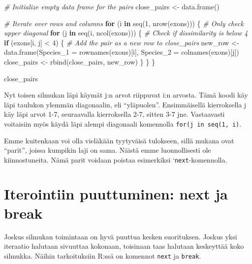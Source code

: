 \documentclass[
]{book}
\newenvironment{Shaded}{\begin{snugshade}}{\end{snugshade}}
\newcommand{\AttributeTok}[1]{\textcolor[rgb]{0.77,0.63,0.00}{#1}}
\newcommand{\CommentTok}[1]{\textcolor[rgb]{0.56,0.35,0.01}{\textit{#1}}}
\newcommand{\ControlFlowTok}[1]{\textcolor[rgb]{0.13,0.29,0.53}{\textbf{#1}}}
\newcommand{\DecValTok}[1]{\textcolor[rgb]{0.00,0.00,0.81}{#1}}
\newcommand{\FunctionTok}[1]{\textcolor[rgb]{0.00,0.00,0.00}{#1}}
\newcommand{\NormalTok}[1]{#1}
\newcommand{\OtherTok}[1]{\textcolor[rgb]{0.56,0.35,0.01}{#1}}
\newcommand{\SpecialCharTok}[1]{\textcolor[rgb]{0.00,0.00,0.00}{#1}}
\begin{document}
\begin{Shaded}
\begin{Highlighting}[]
\CommentTok{\# Initialize empty data frame for the pairs}
\NormalTok{close\_pairs }\OtherTok{\textless{}{-}} \FunctionTok{data.frame}\NormalTok{()}

\CommentTok{\# Iterate over rows and columns}
\ControlFlowTok{for}\NormalTok{ (i }\ControlFlowTok{in} \FunctionTok{seq}\NormalTok{(}\DecValTok{1}\NormalTok{, }\FunctionTok{nrow}\NormalTok{(exons))) \{}
  \CommentTok{\# Only check upper diagonal}
  \ControlFlowTok{for}\NormalTok{ (j }\ControlFlowTok{in} \FunctionTok{seq}\NormalTok{(i, }\FunctionTok{ncol}\NormalTok{(exons))) \{}
    \CommentTok{\# Check if dissimilarity is below 4}
    \ControlFlowTok{if}\NormalTok{ (exons[i, j] }\SpecialCharTok{\textless{}} \DecValTok{4}\NormalTok{) \{}
      \CommentTok{\# Add the pair as a new row to close\_pairs}
\NormalTok{      new\_row }\OtherTok{\textless{}{-}} \FunctionTok{data.frame}\NormalTok{(}\AttributeTok{Species\_1 =} \FunctionTok{rownames}\NormalTok{(exons)[i],}
                            \AttributeTok{Species\_2 =} \FunctionTok{colnames}\NormalTok{(exons)[j])}
\NormalTok{      close\_pairs }\OtherTok{\textless{}{-}} \FunctionTok{rbind}\NormalTok{(close\_pairs,}
\NormalTok{                           new\_row)}
\NormalTok{    \}}
\NormalTok{  \}}
\NormalTok{\}}

\NormalTok{close\_pairs}
\end{Highlighting}
\end{Shaded}

Nyt toisen silmukan läpi käymät j:n arvot riippuvat i:n arvosta. Tämä koodi käy läpi taulukon ylemmän diagonaalin, eli ``yläpuolen''. Ensimmäisellä kierroksella j käy läpi arvot 1-7, seuraavalla kierroksella 2-7, sitten 3-7 jne. Vastaavasti voitaisiin myös käydä läpi alempi diagonaali komennolla \texttt{for(j\ in\ seq(1,\ i)}.

Emme kuitenkaan voi olla vieläkään tyytyväisä tulokseen, sillä mukana ovat ``parit'', joissa kumpikin laji on sama. Näistä emme luonnollisesti ole kiinnostuneita. Nämä parit voidaan poistaa esimerkiksi `\texttt{next}-komennolla.

\hypertarget{iterointiin-puuttuminen-next-ja-break}{%
\section{Iterointiin puuttuminen: next ja break}\label{iterointiin-puuttuminen-next-ja-break}}

Joskus silmukan toimintaan on hyvä puuttua kesken suorituksen. Joskus yksi iteraatio halutaan sivuuttaa kokonaan, toisinaan taas halutaan keskeyttää koko silmukka. Näihin tarkoituksiin R:ssä on komennot \texttt{next} ja \texttt{break}.
\end{document}
